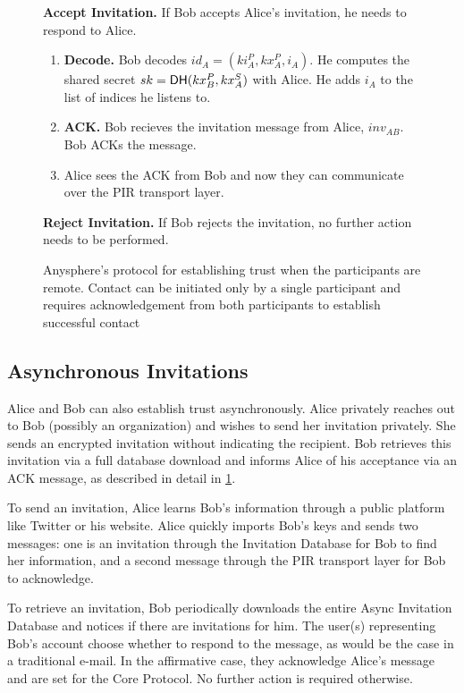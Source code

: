 \begin{figure}[!th]
\begin{framed}
{\begin{hangparas}{1em}{1}
    \medskip

      \textbf{Accept Invitation.}
          If Bob accepts Alice's invitation, he needs to respond to Alice.
          \begin{enumerate}
              \item \textbf{Decode.} Bob decodes $id_A = (ki_A^P, kx_A^P, i_A)$. He computes the shared secret $sk =  \mathsf{DH}(kx_B^P, kx^S_A)$ with Alice. He adds $i_A$ to the list of indices he listens to.
              \item \textbf{ACK.} Bob recieves the invitation message from Alice, $inv_{AB}$. Bob ACKs the message.
              \item Alice sees the ACK from Bob and now they can communicate over the PIR transport layer.
          \end{enumerate}
    \medskip
          
      \textbf{Reject Invitation.}
        If Bob rejects the invitation, no further action needs to be performed.
  \end{hangparas}
  }
  \end{framed}
  \caption{Anysphere's protocol for establishing trust when the participants are remote. Contact can be initiated only by a single participant and requires acknowledgement from both participants to establish successful contact}
  \label{fig:trust-establishment-async}
\end{figure}


\subsection{Asynchronous Invitations}
Alice and Bob can also establish trust asynchronously. Alice privately reaches out to Bob (possibly an organization) and wishes to send her invitation privately. She sends an encrypted invitation without indicating the recipient. Bob retrieves this invitation via a full database download and informs Alice of his acceptance via an ACK message, as described in detail in \cref{fig:trust-establishment-async}.

To send an invitation, Alice learns Bob's information through a public platform like Twitter or his website. Alice quickly imports Bob's keys and sends two messages: one is an invitation through the Invitation Database for Bob to find her information, and a second message through the PIR transport layer for Bob to acknowledge.

To retrieve an invitation, Bob periodically downloads the entire Async Invitation Database and notices if there are invitations for him. The user(s) representing Bob's account choose whether to respond to the message, as would be the case in a traditional e-mail. In the affirmative case, they acknowledge Alice's message and are set for the Core Protocol. No further action is required otherwise.

